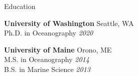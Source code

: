 \documentclass{resume} %
\begin{document}

\begin{rSection}{Education}

{\bf University of Washington} \hfill {Seattle, WA}  \\
Ph.D. in Oceanography  \hfill {\em 2020} 

{\bf University of Maine} \hfill {Orono, ME} \\ 
M.S. in Oceanography  \hfill {\em 2014}  \\ 
B.S. in Marine Science \hfill {\em 2013} 
\end{rSection}

\end{document}
